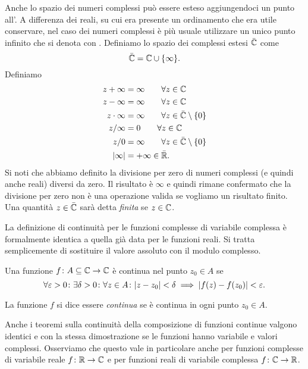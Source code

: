 Anche lo spazio dei numeri complessi può essere esteso aggiungendoci
un punto all'.
A differenza dei reali, su cui era presente un ordinamento che era utile conservare,
nel caso dei numeri complessi è più usuale utilizzare un unico punto infinito
che si denota con \myemph{$\infty$}.
Definiamo lo spazio dei complessi estesi $\bar {\mathbb C}$ come
\[
\bar {\mathbb C} = \mathbb C \cup {\left\{ \infty \right\}}.
\]
Definiamo
\begin{align*}
  z + \infty &= \infty \qquad \forall z \in \mathbb C\\
  z - \infty &= \infty \qquad \forall z \in \mathbb C\\
   z\cdot \infty &= \infty \qquad \forall z \in \bar{\mathbb C}\setminus{\left\{ 0 \right\}} \\
   z / \infty &= 0 \qquad \forall z \in \mathbb C \\
   z / 0 &= \infty \qquad \forall z \in \bar {\mathbb C} \setminus{\left\{ 0 \right\}}\\
   {\left|\infty\right|} &= +\infty \in \bar {\mathbb R}.
\end{align*}
Si noti che abbiamo definito la divisione per zero di numeri complessi
(e quindi anche reali) diversi da zero. Il risultato è $\infty$ e quindi
rimane confermato che la divisione per zero non è una operazione valida
se vogliamo un risultato finito.
Una quantità $z\in \bar {\mathbb C}$ sarà detta \emph{finita} se $z\in \mathbb C$.

La definizione di continuità per le funzioni complesse di variabile complessa
è formalmente identica a quella già data per le funzioni reali.
Si tratta semplicemente di sostituire il valore assoluto con il modulo complesso.
%
\begin{definition}[continuità in $\CC$]
Una funzione $f\colon A \subseteq \mathbb C \to \mathbb C$ è
continua nel punto $z_0\in A$ se
\[
\forall \varepsilon>0\colon \exists \delta>0 \colon \forall z\in A\colon
{\left|z-z_0\right|}<\delta \implies {\left|f(z)-f(z_0)\right|} < \varepsilon.
\]

La funzione $f$ si dice essere \emph{continua} se
è continua in ogni punto $z_0\in A$.
\end{definition}

Anche i teoremi sulla continuità della composizione di funzioni
continue valgono identici e con la stessa dimostrazione
se le funzioni hanno variabile e valori complessi.
Osserviamo che questo vale
in particolare anche per funzioni complesse di variabile reale
$f\colon \mathbb R\to \mathbb C$ e per funzioni reali di variabile complessa
$f\colon \mathbb C \to \mathbb R$.

